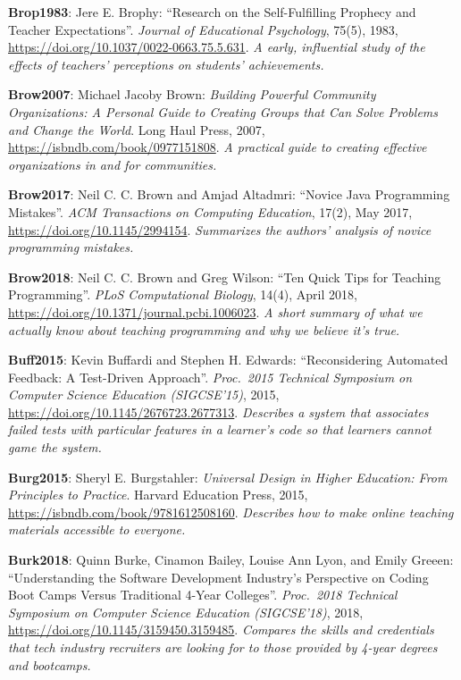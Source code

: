 \textbf{\hypertarget{b:Brop1983}{Brop1983}\label{b:Brop1983}}: Jere E. Brophy: ``Research on the Self-Fulfilling Prophecy and Teacher Expectations''. \emph{Journal of Educational Psychology}, 75(5), 1983, \url{https://doi.org/10.1037/0022-0663.75.5.631}. \emph{A early, influential study of the effects of teachers' perceptions on students' achievements.}

\textbf{\hypertarget{b:Brow2007}{Brow2007}\label{b:Brow2007}}: Michael Jacoby Brown: \emph{Building Powerful Community Organizations: A Personal Guide to Creating Groups that Can Solve Problems and Change the World}. Long Haul Press, 2007, \url{https://isbndb.com/book/0977151808}. \emph{A practical guide to creating effective organizations in and for communities.}

\textbf{\hypertarget{b:Brow2017}{Brow2017}\label{b:Brow2017}}: Neil C. C. Brown and Amjad Altadmri: ``Novice Java Programming Mistakes''. \emph{ACM Transactions on Computing Education}, 17(2), May 2017, \url{https://doi.org/10.1145/2994154}. \emph{Summarizes the authors' analysis of novice programming mistakes.}

\textbf{\hypertarget{b:Brow2018}{Brow2018}\label{b:Brow2018}}: Neil C. C. Brown and Greg Wilson: ``Ten Quick Tips for Teaching Programming''. \emph{PLoS Computational Biology}, 14(4), April 2018, \url{https://doi.org/10.1371/journal.pcbi.1006023}. \emph{A short summary of what we actually know about teaching programming and why we believe it's true.}

\textbf{\hypertarget{b:Buff2015}{Buff2015}\label{b:Buff2015}}: Kevin Buffardi and Stephen H. Edwards: ``Reconsidering Automated Feedback: A Test-Driven Approach''. \emph{Proc.\ 2015 Technical Symposium on Computer Science Education (SIGCSE'15)}, 2015, \url{https://doi.org/10.1145/2676723.2677313}. \emph{Describes a system that associates failed tests with particular features in a learner's code so that learners cannot game the system.}

\textbf{\hypertarget{b:Burg2015}{Burg2015}\label{b:Burg2015}}: Sheryl E. Burgstahler: \emph{Universal Design in Higher Education: From Principles to Practice}. Harvard Education Press, 2015, \url{https://isbndb.com/book/9781612508160}. \emph{Describes how to make online teaching materials accessible to everyone.}

\textbf{\hypertarget{b:Burk2018}{Burk2018}\label{b:Burk2018}}: Quinn Burke, Cinamon Bailey, Louise Ann Lyon, and Emily Greeen: ``Understanding the Software Development Industry's Perspective on Coding Boot Camps Versus Traditional 4-Year Colleges''. \emph{Proc.\ 2018 Technical Symposium on Computer Science Education (SIGCSE'18)}, 2018, \url{https://doi.org/10.1145/3159450.3159485}. \emph{Compares the skills and credentials that tech industry recruiters are looking for to those provided by 4-year degrees and bootcamps.}

